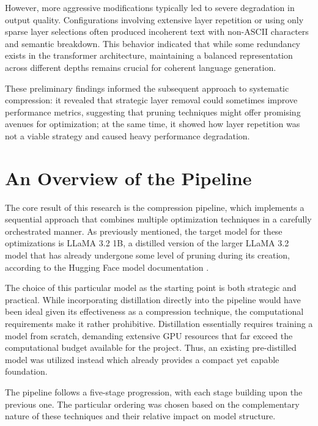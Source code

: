 However, more aggressive modifications typically led to severe degradation in output quality. Configurations involving extensive layer repetition or using only sparse layer selections often produced incoherent text with non-ASCII characters and semantic breakdown. This behavior indicated that while some redundancy exists in the transformer architecture, maintaining a balanced representation across different depths remains crucial for coherent language generation.

These preliminary findings informed the subsequent approach to systematic compression: it revealed that strategic layer removal could sometimes improve performance metrics, suggesting that pruning techniques might offer promising avenues for optimization; at the same time, it showed how layer repetition was not a viable strategy and caused heavy performance degradation.

\section{An Overview of the Pipeline}

The core result of this research is the compression pipeline, which implements a sequential approach that combines multiple optimization techniques in a carefully orchestrated manner. As previously mentioned, the target model for these optimizations is LLaMA 3.2 1B, a distilled version of the larger LLaMA 3.2 model that has already undergone some level of pruning during its creation, according to the Hugging Face model documentation \cite{llama3_1b}.

The choice of this particular model as the starting point is both strategic and practical. While incorporating distillation directly into the pipeline would have been ideal given its effectiveness as a compression technique, the computational requirements make it rather prohibitive. Distillation essentially requires training a model from scratch, demanding extensive GPU resources that far exceed the computational budget available for the project. Thus, an existing pre-distilled model was utilized instead which already provides a compact yet capable foundation.

The pipeline follows a five-stage progression, with each stage building upon the previous one. The particular ordering was chosen based on the complementary nature of these techniques and their relative impact on model structure.

